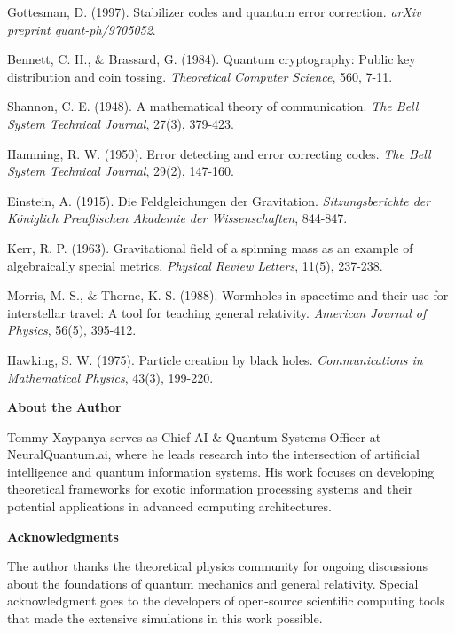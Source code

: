 \documentclass[12pt,a4paper]{article}
\begin{document}
\begin{thebibliography}{99}
Gottesman, D. (1997). Stabilizer codes and quantum error correction. \textit{arXiv preprint quant-ph/9705052}.

Bennett, C. H., \& Brassard, G. (1984). Quantum cryptography: Public key distribution and coin tossing. \textit{Theoretical Computer Science}, 560, 7-11.

Shannon, C. E. (1948). A mathematical theory of communication. \textit{The Bell System Technical Journal}, 27(3), 379-423.

Hamming, R. W. (1950). Error detecting and error correcting codes. \textit{The Bell System Technical Journal}, 29(2), 147-160.

Einstein, A. (1915). Die Feldgleichungen der Gravitation. \textit{Sitzungsberichte der Königlich Preußischen Akademie der Wissenschaften}, 844-847.

Kerr, R. P. (1963). Gravitational field of a spinning mass as an example of algebraically special metrics. \textit{Physical Review Letters}, 11(5), 237-238.

Morris, M. S., \& Thorne, K. S. (1988). Wormholes in spacetime and their use for interstellar travel: A tool for teaching general relativity. \textit{American Journal of Physics}, 56(5), 395-412.

Hawking, S. W. (1975). Particle creation by black holes. \textit{Communications in Mathematical Physics}, 43(3), 199-220.

\end{thebibliography}

\vspace{1cm}

\noindent\textbf{About the Author}

Tommy Xaypanya serves as Chief AI \& Quantum Systems Officer at NeuralQuantum.ai, where he leads research into the intersection of artificial intelligence and quantum information systems. His work focuses on developing theoretical frameworks for exotic information processing systems and their potential applications in advanced computing architectures.

\vspace{0.5cm}

\noindent\textbf{Acknowledgments}

The author thanks the theoretical physics community for ongoing discussions about the foundations of quantum mechanics and general relativity. Special acknowledgment goes to the developers of open-source scientific computing tools that made the extensive simulations in this work possible.
\end{document}
